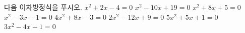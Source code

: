 다음 이차방정식을 푸시오.
 $x^2+2x-4=0$
 $x^2-10x+19=0$
 $x^2+8x+5=0$
 $x^2-3x-1=0$
 $4x^2+8x-3=0$
 $2x^2-12x+9=0$
 $5x^2+5x+1=0$
 $3x^2-4x-1=0$
